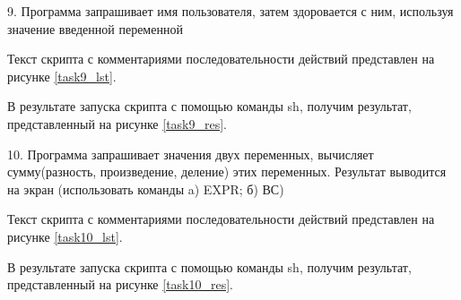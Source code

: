 
9. Программа  запрашивает  имя  пользователя,  затем  здоровается  с  ним, используя значение введенной переменной

Текст скрипта с комментариями последовательности действий представлен на рисунке \ref{task9_lst}.


В результате запуска скрипта с помощью команды sh, получим результат, представленный на рисунке \ref{task9_res}.


10. Программа запрашивает значения двух переменных, вычисляет сумму(разность,  произведение,  деление)  этих  переменных.  Результат  выводится  на экран (использовать команды a) EXPR; б) ВС)

Текст скрипта с комментариями последовательности действий представлен на рисунке \ref{task10_lst}.


В результате запуска скрипта с помощью команды sh, получим результат, представленный на рисунке \ref{task10_res}.


